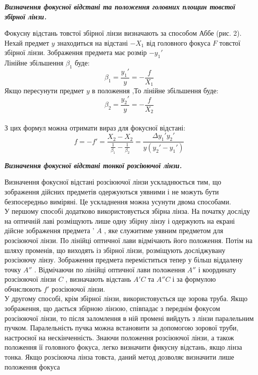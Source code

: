 \newpage
\begin{center}
  {\textbf{\emph{Визначення фокусної відстані та положення головних площин товстої
збірної лінзи.}}}
\end{center}
Фокусну відстань товстої збірної лінзи визначають за способом Аббе (рис. 2). Нехай
предмет $y$ знаходиться на відстані $-X_1$
 від головного фокуса $F$ товстої збірної лінзи.
Зображення предмета має розмір $-y_1'$\\
Лінійне збільшення ${\beta}_1$ буде:
$${\beta}_1 = \frac{y_1'}{y}=-\frac{f}{X_1}$$
Якщо пересунути предмет $y$ в положення ,То лінійне збільшення буде:
$${\beta}_2 = \frac{y_2'}{y}=-\frac{f}{X_2}$$ \\
З цих формул можна отримати вираз для фокусної відстані:
$$f=-f'=\frac{X_2-X_2}{\frac{1}{{\beta}_1}-\frac{1}{{\beta}_2}}=\frac{\Delta y_1' y_2'}{y(y_2'-y_1')}$$
\begin{center}
  {\textbf{\emph{Визначення фокусної відстані тонкої розсіюючої лінзи.}}}
\end{center}
Визначення фокусної відстані розсіюючої лінзи ускладнюється тим, що зображення
дійсних предметів одержуються уявними і не можуть бути безпосередньо виміряні. Це
ускладнення можна усунути двома способами.\\
У першому способі додатково використовується збірна лінза. На початку досліду на
оптичній лаві розміщують лише одну збірну лінзу  і одержують на екрані дійсне
зображення предмета '
$A$ , яке служитиме уявним предметом для розсіюючої лінзи. По лінійці
оптичної лави відмічають його положення. Потім на шляху променів, що виходять із збірної
лінзи, розміщують досліджувану розсіюючу лінзу. Зображення предмета переміститься
тепер у більш віддалену точку
$A''$ . Відмічаючи по лінійці оптичної лави положення $A''$ і координату розсіюючої лінзи $C$ , визначають відстань $A'C$ та $A''C$ і за формулою обчислюють $f'$ розсіюючої лінзи.\\
У другому способі, крім збірної лінзи, використовується ще зорова труба. Якщо
зображення, що дається збірною лінзою, співпадає з переднім фокусом розсіюючої лінзи, то
після заломлення в ній промені вийдуть з лінзи паралельним пучком. Паралельність пучка можна
встановити за допомогою зорової труби, настроєної на нескінченність. Знаючи положення
розсіюючої лінзи, а також положення її головного фокуса, легко визначити фикусну відстань,
якщо лінза тонка. Якщо розсіююча лінза товста, даний метод дозволяє визначити лише
положення фокуса
